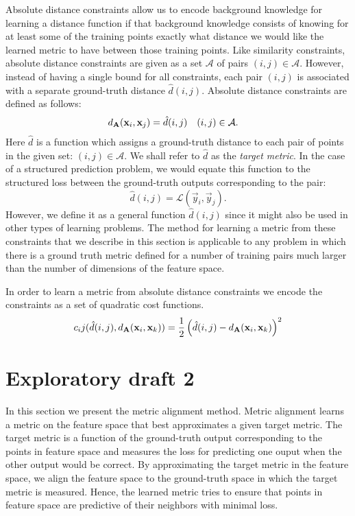 Absolute distance constraints allow us to encode background knowledge for learning a distance function if that background knowledge consists of knowing for at least some of the training points exactly what distance we would like the learned metric to have between those training points.
Like similarity constraints, absolute distance constraints are given as a set $\mathcal{A}$ of pairs $(i,j) \in \mathcal{A}$.
However, instead of having a single bound for all constraints, each pair $(i,j)$ is associated with a separate ground-truth distance $\hat{d}(i,j)$. 
Absolute distance constraints are defined as follows: 
\begin{align}
d_{\mathbf{A}}(\mathbf{x}_i, \mathbf{x}_j) &= \hat{d}(i,j) & (i, j) &\in \mathcal{A}.
\end{align}
Here $\hat{d}$ is a function which assigns a ground-truth distance to each pair of points in the given set: $(i,j) \in \mathcal{A}$. We shall refer to $\hat{d}$ as the \emph{target metric}.
In the case of a structured prediction problem, we would equate this function to the structured loss between the ground-truth outputs corresponding to the pair:
\begin{equation}
\hat{d}(i,j) = \mathcal{L}(\vec{y}_i, \vec{y}_j).
\end{equation}
However, we define it as a general function $\hat{d}(i,j)$ since it might also be used in other types of learning problems.
The method for learning a metric from these constraints that we describe in this section is applicable to any problem in which there is a ground truth metric defined for a number of training pairs much larger than the number of dimensions of the feature space.


In order to learn a metric from absolute distance constraints we encode the constraints as a set of quadratic cost functions.
\begin{equation}
c_ij(\hat{d}(i,j), d_{\mathbf{A}}(\mathbf{x}_i, \mathbf{x}_k)) = \frac{1}{2} \left( \hat{d}(i,j) - d_{\mathbf{A}}(\mathbf{x}_i, \mathbf{x}_k) \right)^2
\end{equation}




\section*{Exploratory draft 2}

In this section we present the metric alignment method.
Metric alignment learns a metric on the feature space that best approximates a given target metric.
The target metric is a function of the ground-truth output corresponding to the points in feature space and measures the loss for predicting one ouput when the other output would be correct.
By approximating the target metric in the feature space, we align the feature space to the ground-truth space in which the target metric is measured.
Hence, the learned metric tries to ensure that points in feature space are predictive of their neighbors with minimal loss.

